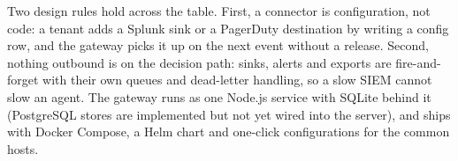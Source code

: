 Two design rules hold across the table. First, a connector is
configuration, not code: a tenant adds a Splunk sink or a PagerDuty
destination by writing a config row, and the gateway picks it up on the
next event without a release. Second, nothing outbound is on the
decision path: sinks, alerts and exports are fire-and-forget with their
own queues and dead-letter handling, so a slow SIEM cannot slow an agent.
The gateway runs as one Node.js service with SQLite behind it (PostgreSQL stores are implemented but not yet wired into the server), and ships with Docker Compose, a Helm chart and one-click
configurations for the common hosts.
